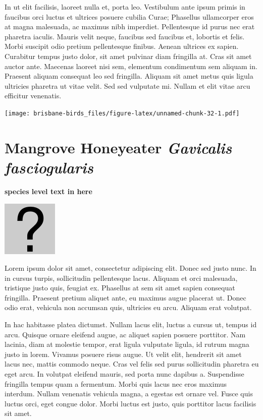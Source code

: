 \documentclass[]{book}
\let\origfigure\figure
\let\endorigfigure\endfigure
\renewenvironment{figure}[1][2] {
  \expandafter\origfigure\expandafter[H]
} {
  \endorigfigure
}
\begin{document}
In ut elit facilisis, laoreet nulla et, porta leo. Vestibulum ante ipsum
primis in faucibus orci luctus et ultrices posuere cubilia Curae;
Phasellus ullamcorper eros at magna malesuada, ac maximus nibh
imperdiet. Pellentesque id purus nec erat pharetra iaculis. Mauris velit
neque, faucibus sed faucibus et, lobortis et felis. Morbi suscipit odio
pretium pellentesque finibus. Aenean ultrices ex sapien. Curabitur
tempus justo dolor, sit amet pulvinar diam fringilla at. Cras sit amet
auctor ante. Maecenas laoreet nisi sem, elementum condimentum sem
aliquam in. Praesent aliquam consequat leo sed fringilla. Aliquam sit
amet metus quis ligula ultricies pharetra ut vitae velit. Sed sed
vulputate mi. Nullam et elit vitae arcu efficitur venenatis.

\begin{figure}
\centering
\texttt{[image: brisbane-birds\_files/figure-latex/unnamed-chunk-32-1.pdf]}
\caption{\label{fig:unnamed-chunk-32}insert figure caption}
\end{figure}

\section{\texorpdfstring{Mangrove Honeyeater \emph{Gavicalis
fasciogularis}}{Mangrove Honeyeater Gavicalis fasciogularis}}\label{mangrove-honeyeater-gavicalis-fasciogularis}

\textbf{species level text in here}

\begin{figure}
\centering
\includegraphics{assets/missing.png}
\caption{No image for species}
\end{figure}

Lorem ipsum dolor sit amet, consectetur adipiscing elit. Donec sed justo
nunc. In in cursus turpis, sollicitudin pellentesque lacus. Aliquam et
orci malesuada, tristique justo quis, feugiat ex. Phasellus at sem sit
amet sapien consequat fringilla. Praesent pretium aliquet ante, eu
maximus augue placerat ut. Donec odio erat, vehicula non accumsan quis,
ultricies eu arcu. Aliquam erat volutpat.

In hac habitasse platea dictumst. Nullam lacus elit, luctus a cursus ut,
tempus id arcu. Quisque ornare eleifend augue, ac aliquet sapien posuere
porttitor. Nam lacinia, diam at molestie tempor, erat ligula vulputate
ligula, id rutrum magna justo in lorem. Vivamus posuere risus augue. Ut
velit elit, hendrerit sit amet lacus nec, mattis commodo neque. Cras vel
felis sed purus sollicitudin pharetra eu eget arcu. In volutpat eleifend
mauris, sed porta nunc dapibus a. Suspendisse fringilla tempus quam a
fermentum. Morbi quis lacus nec eros maximus interdum. Nullam venenatis
vehicula magna, a egestas est ornare vel. Fusce quis luctus orci, eget
congue dolor. Morbi luctus est justo, quis porttitor lacus facilisis sit
amet.
\end{document}
